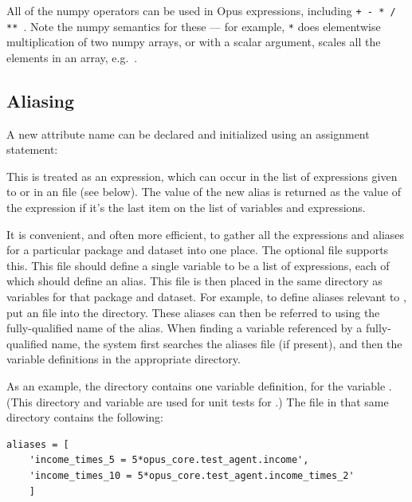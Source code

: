 All of the numpy operators can be used in Opus expressions, including
\verb|+ - * / ** |.  Note the numpy semantics for these --- for example,
\verb|*| does elementwise multiplication of two numpy arrays, or with a
scalar argument, scales all the elements in an array,
e.g.\ .

\subsection{Aliasing}
\label{sec:aliasing}

A new attribute name can be declared and initialized using an assignment
statement:


This is treated as an expression, which can occur in the list of
expressions given to  or in an 
file (see below).  The value of the new alias is returned as the value of
the expression if it's the last item on the list of variables and
expressions.

It is convenient, and often more efficient, to gather all the expressions
and aliases for a particular package and dataset into one place.  The
optional  file supports this.  
This file should define a
single variable  to be a list of expressions, each of which
should define an alias.  This file is then placed in the same directory as
variables for that package and dataset.  For example, to define aliases
relevant to , put an  file into
the  directory.  These aliases can then be referred
to using the fully-qualified name of the alias.  When finding a variable
referenced by a fully-qualified name, the system first searches the aliases
file (if present), and then the variable definitions in the appropriate
directory.

As an example, the directory  contains one
variable definition, for the variable .  (This
directory and variable are used for unit tests for .)
The file  in that same directory contains the following:

\begin{verbatim}
aliases = [
    'income_times_5 = 5*opus_core.test_agent.income',
    'income_times_10 = 5*opus_core.test_agent.income_times_2'
    ]
\end{verbatim}


